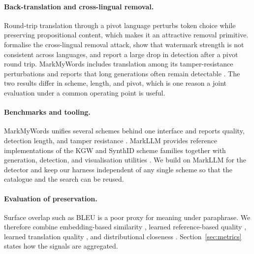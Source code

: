 \paragraph{Back-translation and cross-lingual removal.}
Round-trip translation through a pivot language perturbs token choice while preserving propositional content, which makes it an attractive removal primitive. \citet{cwra} formalise the cross-lingual removal attack, show that watermark strength is not consistent across languages, and report a large drop in detection after a pivot round trip. MarkMyWords includes translation among its tamper-resistance perturbations and reports that long generations often remain detectable \citep{markmywords}. The two results differ in scheme, length, and pivot, which is one reason a joint evaluation under a common operating point is useful.

\paragraph{Benchmarks and tooling.}
MarkMyWords unifies several schemes behind one interface and reports quality, detection length, and tamper resistance \citep{markmywords}. MarkLLM provides reference implementations of the KGW and SynthID scheme families together with generation, detection, and visualisation utilities \citep{markllm}. We build on MarkLLM for the detector and keep our harness independent of any single scheme so that the catalogue and the search can be reused.

\paragraph{Evaluation of preservation.}
Surface overlap such as BLEU is a poor proxy for meaning under paraphrase. We therefore combine embedding-based similarity \citep{bertscore}, learned reference-based quality \citep{bleurt}, learned translation quality \citep{comet}, and distributional closeness \citep{mauve}. Section~\ref{sec:metrics} states how the signals are aggregated.
